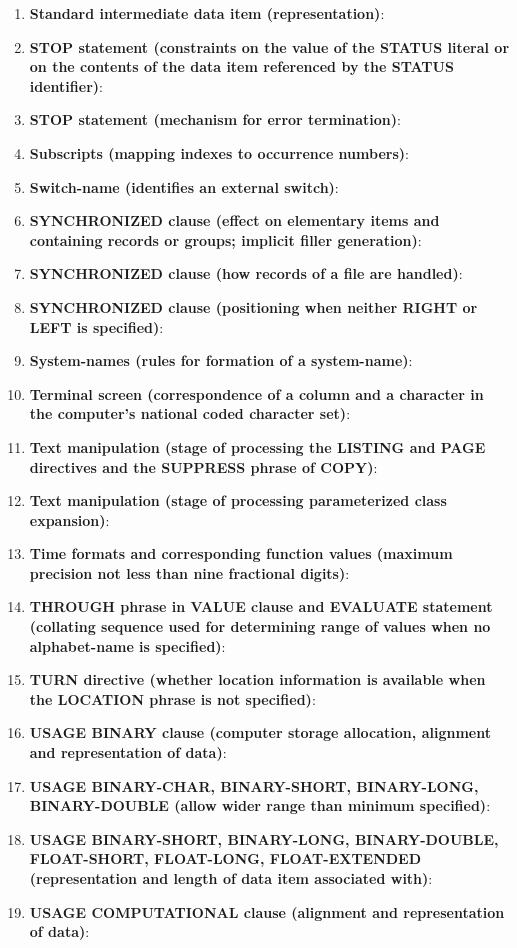 \begin{enumerate}
\item \textbf{Standard intermediate data item (representation)}:
\item \textbf{STOP statement (constraints on the value of the STATUS literal or on the contents of the data item referenced by the STATUS identifier)}:
\item \textbf{STOP statement (mechanism for error termination)}:
\item \textbf{Subscripts (mapping indexes to occurrence numbers)}:
\item \textbf{Switch-name (identifies an external switch)}:
\item \textbf{SYNCHRONIZED clause (effect on elementary items and containing records or groups; implicit filler generation)}:
\item \textbf{SYNCHRONIZED clause (how records of a file are handled)}:
\item \textbf{SYNCHRONIZED clause (positioning when neither RIGHT or LEFT is specified)}:
\item \textbf{System-names (rules for formation of a system-name)}:
\item \textbf{Terminal screen (correspondence of a column and a character in the computer's national coded character set)}:
\item \textbf{Text manipulation (stage of processing the LISTING and PAGE directives and the SUPPRESS phrase of COPY)}:
\item \textbf{Text manipulation (stage of processing parameterized class expansion)}:
\item \textbf{Time formats and corresponding function values (maximum precision not less than nine fractional digits)}:
\item \textbf{THROUGH phrase in VALUE clause and EVALUATE statement (collating sequence used for determining range of values when no alphabet-name is specified)}:
\item \textbf{TURN directive (whether location information is available when the LOCATION phrase is not specified)}:
\item \textbf{USAGE BINARY clause (computer storage allocation, alignment and representation of data)}:
\item \textbf{USAGE BINARY-CHAR, BINARY-SHORT, BINARY-LONG, BINARY-DOUBLE (allow wider range than minimum specified)}:
\item \textbf{USAGE BINARY-SHORT, BINARY-LONG, BINARY-DOUBLE, FLOAT-SHORT, FLOAT-LONG, FLOAT-EXTENDED (representation and length of data item associated with)}:
\item \textbf{USAGE COMPUTATIONAL clause (alignment and representation of data)}:

\end{enumerate}
